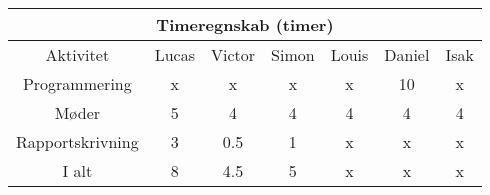 \centering
\begin{tabular}{ |c|c|c|c|c|c|c|  }
 \hline
 \multicolumn{7}{|c|}{Timeregnskab (timer)} \\
 \hline
 Aktivitet & Lucas & Victor & Simon & Louis & Daniel & Isak\\
 \hline
 
 
 Programmering      & x & x & x & x & 10 & x \\
 
 Møder              & 5 & 4 & 4 & 4 & 4 & 4 \\
 
 Rapportskrivning   & 3 & 0.5 & 1 & x & x & x \\
 
 \hline
 
 I alt              & 8 & 4.5 & 5 & x & x & x \\
 
 
 \hline
\end{tabular}